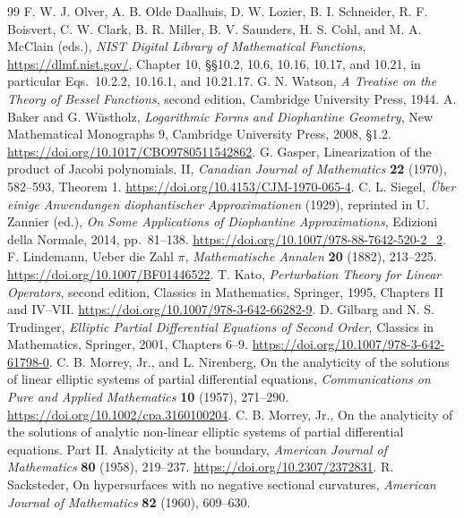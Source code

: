 \begin{thebibliography}{99}
F. W. J. Olver, A. B. Olde Daalhuis, D. W. Lozier, B. I. Schneider,
R. F. Boisvert, C. W. Clark, B. R. Miller, B. V. Saunders, H. S. Cohl,
and M. A. McClain (eds.),
\emph{NIST Digital Library of Mathematical Functions},
\url{https://dlmf.nist.gov/}, Chapter 10,
\S\S10.2, 10.6, 10.16, 10.17, and 10.21, in particular
Eqs.~10.2.2, 10.16.1, and 10.21.17.
G. N. Watson, \emph{A Treatise on the Theory of Bessel Functions},
second edition, Cambridge University Press, 1944.
A. Baker and G. W\"ustholz,
\emph{Logarithmic Forms and Diophantine Geometry},
New Mathematical Monographs 9, Cambridge University Press, 2008,
\S1.2.
\url{https://doi.org/10.1017/CBO9780511542862}.
G. Gasper, Linearization of the product of Jacobi polynomials. II,
\emph{Canadian Journal of Mathematics} \textbf{22} (1970), 582--593,
Theorem 1. \url{https://doi.org/10.4153/CJM-1970-065-4}.
C. L. Siegel, \emph{\"Uber einige Anwendungen diophantischer Approximationen}
(1929), reprinted in U. Zannier (ed.), \emph{On Some Applications of
Diophantine Approximations}, Edizioni della Normale, 2014, pp.~81--138.
\url{https://doi.org/10.1007/978-88-7642-520-2_2}.
F. Lindemann, Ueber die Zahl $\pi$,
\emph{Mathematische Annalen} \textbf{20} (1882), 213--225.
\url{https://doi.org/10.1007/BF01446522}.
T. Kato, \emph{Perturbation Theory for Linear Operators},
second edition, Classics in Mathematics, Springer, 1995,
Chapters II and IV--VII.
\url{https://doi.org/10.1007/978-3-642-66282-9}.
D. Gilbarg and N. S. Trudinger,
\emph{Elliptic Partial Differential Equations of Second Order},
Classics in Mathematics, Springer, 2001, Chapters 6--9.
\url{https://doi.org/10.1007/978-3-642-61798-0}.
C. B. Morrey, Jr., and L. Nirenberg,
On the analyticity of the solutions of linear elliptic systems of
partial differential equations,
\emph{Communications on Pure and Applied Mathematics}
\textbf{10} (1957), 271--290.
\url{https://doi.org/10.1002/cpa.3160100204}.
C. B. Morrey, Jr., On the analyticity of the solutions of analytic
non-linear elliptic systems of partial differential equations.
Part II. Analyticity at the boundary,
\emph{American Journal of Mathematics} \textbf{80} (1958), 219--237.
\url{https://doi.org/10.2307/2372831}.
R. Sacksteder, On hypersurfaces with no negative sectional curvatures,
\emph{American Journal of Mathematics} \textbf{82} (1960), 609--630.

\end{thebibliography}
